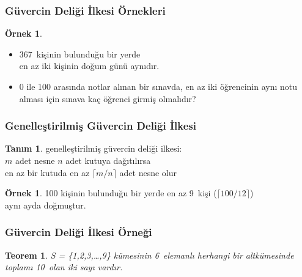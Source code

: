\documentclass[dvipsnames]{beamer}
\theoremstyle{definition}
\newtheorem{tanim}[theorem]{Tanım}
\theoremstyle{example}
\newtheorem{ornek}[theorem]{Örnek}
\theoremstyle{plain}
\newtheorem{teorem}[theorem]{Teorem}
\begin{document}
\begin{frame}
  \frametitle{Güvercin Deliği İlkesi Örnekleri}

  \begin{ornek}
    \begin{itemize}
      \item 367~kişinin bulunduğu bir yerde\\
        en az iki kişinin doğum günü aynıdır.

      \pause
      \item 0 ile 100 arasında notlar alınan bir sınavda, en az iki öğrencinin
        aynı notu alması için sınava kaç öğrenci girmiş olmalıdır?
    \end{itemize}
  \end{ornek}
\end{frame}

\begin{frame}
  \frametitle{Genelleştirilmiş Güvercin Deliği İlkesi}

  \begin{tanim}
    \alert{genelleştirilmiş güvercin deliği ilkesi}:\\
    $m$ adet nesne $n$ adet kutuya dağıtılırsa\\
    en az bir kutuda en az $\lceil m / n \rceil$ adet nesne olur
  \end{tanim}

  \pause
  \begin{ornek}
    100 kişinin bulunduğu bir yerde en az 9~kişi ($\lceil 100 / 12 \rceil$)\\
    aynı ayda doğmuştur.
  \end{ornek}
\end{frame}

\begin{frame}
  \frametitle{Güvercin Deliği İlkesi Örneği}

  \begin{teorem}
    S = \{1,2,3,\dots,9\} kümesinin 6~elemanlı herhangi bir altkümesinde\\
    toplamı 10~olan iki sayı vardır.
  \end{teorem}
\end{frame}
\end{document}
